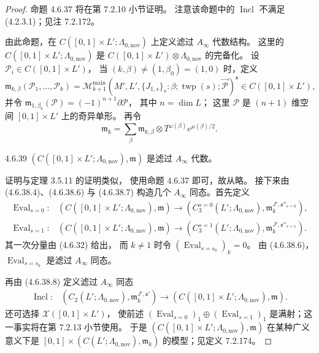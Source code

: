\begin{proof}
命题 4.6.37 将在第 7.2.10 小节证明。
注意该命题中的 $\operatorname{Incl}$
不满足 (4.2.3.1)；见注 7.2.172。

由此命题，在
$C([0,1]\times L';\Lambda_{0,\mathrm{nov}})$
上定义滤过 $A_\infty$ 代数结构。
这里的 $C([0,1]\times L';\Lambda_{0,\mathrm{nov}})$
是 $C([0,1]\times L')\otimes
\Lambda_{0,\mathrm{nov}}$ 的完备化。
设 $\mathcal P_i\in C([0,1]\times L')$，
当 $(k,\beta)\ne(1,\beta_0)=(1,0)$ 时，定义
\[
\mathfrak m_{k,\beta}
(\mathcal P_1,\ldots,\mathcal P_k)
=\mathcal M_{k+1}^{\mathrm{main}}
(M',L',\{J_{1,s}\}_s:
\beta;\operatorname{twp}(s);
\vec{\mathcal P})^{\mathfrak s}
\in C([0,1]\times L'),
\]
并令
$\mathfrak m_{1,\beta_0}(\mathcal P)
=(-1)^{n+1}\partial\mathcal P$，
其中 $n=\dim L$；
这里 $\mathcal P$ 是 $(n+1)$ 维空间
$[0,1]\times L'$ 上的奇异单形。
再令
\[
\mathfrak m_k
=\sum_\beta\mathfrak m_{k,\beta}
\otimes T^{\omega(\beta)}e^{\mu(\beta)/2}.
\]

\begin{lemma}{4.6.39}\label{lem:4-6-39}
$(C([0,1]\times L';\Lambda_{0,\mathrm{nov}}),
\mathfrak m)$ 是滤过 $A_\infty$ 代数。
\end{lemma}
证明与定理 3.5.11 的证明类似，
使用命题 4.6.37 即可，故从略。
接下来由 (4.6.38.4)、(4.6.38.6) 与 (4.6.38.7)
构造几个 $A_\infty$ 同态。首先定义
\[
\begin{aligned}
\operatorname{Eval}_{s=0}\colon
&(C([0,1]\times L';\Lambda_{0,\mathrm{nov}}),
  \mathfrak m)
\longrightarrow
(C_3^{s=0}(L';\Lambda_{0,\mathrm{nov}}),
  \mathfrak m_k^{J',\mathfrak s''_{s=0}}),\\
\operatorname{Eval}_{s=1}\colon
&(C([0,1]\times L';\Lambda_{0,\mathrm{nov}}),
  \mathfrak m)
\longrightarrow
(C_3^{s=1}(L';\Lambda_{0,\mathrm{nov}}),
  \mathfrak m_k^{J',\mathfrak s''_{s=1}}).
\end{aligned}
\]
其一次分量由 (4.6.32) 给出，
而 $k\ne1$ 时令
$(\operatorname{Eval}_{s=s_0})_k=0$。
由 (4.6.38.6)，
$\operatorname{Eval}_{s=s_0}$
是滤过 $A_\infty$ 同态。

再由 (4.6.38.8) 定义滤过 $A_\infty$ 同态
\[
\begin{aligned}
\operatorname{Incl}\colon
&(C_2(L';\Lambda_{0,\mathrm{nov}}),
  \mathfrak m_k^{J',\mathfrak s'})
\longrightarrow
(C([0,1]\times L';\Lambda_{0,\mathrm{nov}}),
  \mathfrak m).
\end{aligned}
\]
还可选择 $\mathcal X([0,1]\times L')$，
使前述
$(\operatorname{Eval}_{s=0})_1
\oplus(\operatorname{Eval}_{s=1})_1$
是满射；这一事实将在第 7.2.13 小节使用。
于是
$(C([0,1]\times L';\Lambda_{0,\mathrm{nov}}),
\mathfrak m)$
在某种广义意义下是
$[0,1]\times
(C(L';\Lambda_{0,\mathrm{nov}}),\mathfrak m_k)$
的模型；见定义 7.2.174。


\end{proof}
